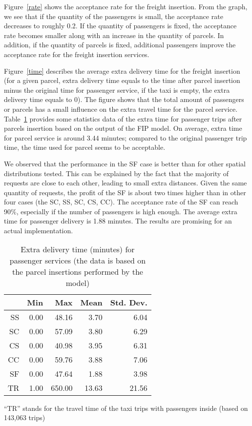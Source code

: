 \documentclass[preprint,authoryear,12pt]{elsarticle}
\begin{document}
Figure~\ref{rate} shows the acceptance rate for the freight insertion. From the graph, we see that if the quantity of the passengers is small, the acceptance rate decreases to roughly 0.2. If the quantity of passengers is fixed, the acceptance rate becomes smaller along with an increase in the quantity of parcels. In addition, if the quantity of parcels is fixed, additional passengers improve the acceptance rate for the freight insertion services.



Figure~\ref{time} describes the average extra delivery time for the freight insertion (for a given parcel, extra delivery time equals to the time after parcel insertion minus the original time for passenger service, if the taxi is empty, the extra delivery time equals to 0). The figure shows that the total amount of passengers or parcels has a small influence on the extra travel time for the parcel service.  Table~\ref{parceltime} provides some statistics data of the extra time for passenger trips after parcels insertion based on the output of the FIP model. On average, extra time for parcel service is around 3.44 minutes; compared to the original passenger trip time, the time used for parcel seems to be acceptable.

We observed that the performance in the SF case is better than for other spatial distributions tested. This can be explained by the fact that the majority of requests are close to each other, leading to small extra distances. Given the same quantity of requests, the profit of the SF is about two times higher than in other four cases (the SC, SS, SC, CS, CC). The acceptance rate of the SF can reach 90\%, especially if the number of passengers is high enough. The average extra time for passenger delivery is 1.88 minutes. The results are promising for an actual implementation.

\begin{table} [!htbp]
\caption{Extra delivery time (minutes) for passenger services (the data is based on the parcel insertions performed by the model)}
\vspace{-1em}
\begin{center}
\small
\begin{tabular}{r r r r r }
\hline
&Min&Max&Mean&Std. Dev.\\
\hline
SS&0.00&48.16&3.70&6.04\\
SC&0.00&57.09&3.80&6.29\\
CS&0.00&40.98&3.95&6.31\\
CC&0.00&59.76&3.88&7.06\\
SF&0.00&47.64&1.88&3.98\\
\hline
TR &1.00&650.00&13.63&21.56\\
\hline
\end{tabular}
\end{center}
\small
\footnotesize{``TR'' stands for the travel time of the taxi trips with passengers inside (based on 143,063 trips)}

\label{parceltime}
\end{table}
\end{document}
